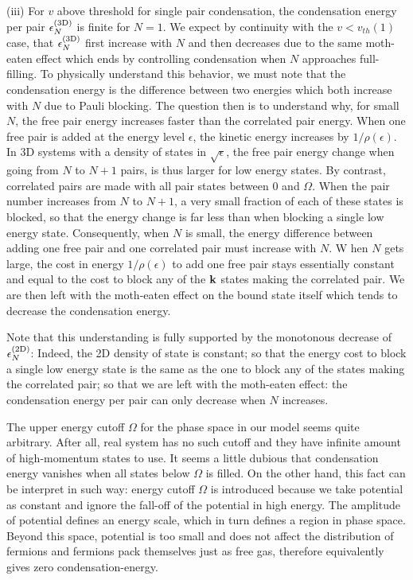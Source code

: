 \documentclass[5p,twocolumn]{elsarticle}
\begin{document}
(iii) For $v$ above threshold for single pair condensation, the condensation energy per pair $\epsilon^{{\text{(3D)}}}_N$ is finite for $N=1$. We expect by continuity with the $v<v_{th}(1)$ case, that $\epsilon^{{\text{(3D)}}}_N$ first increase with $N$ and then decreases due to the same moth-eaten effect which ends by controlling condensation when $N$ approaches full-filling.  
To physically understand this behavior, we must note that the condensation energy is the difference between two energies which both increase with $N$ due to Pauli blocking.  The question then is to understand why, for small $N$, the free pair energy increases faster than the correlated pair energy. When one free pair is added at the energy level $\epsilon$, the kinetic energy increases by $1/\rho(\epsilon)$.  In 3D systems with a density of states in $\sqrt{\epsilon}$, the free pair energy change when going from $N$ to $N+1$ pairs, is thus larger for low energy states. By contrast, correlated pairs are made with all pair states between $0$ and $\Omega$. When the pair number increases from $N$ to $N+1$, a very small fraction of each of these states is blocked, so that the energy change is far less than when blocking a single low energy state.  Consequently, when $N$ is small,  the energy difference between adding one free pair and one correlated pair must increase with $N$. W
 hen $N$ gets large, the cost in energy $1/\rho(\epsilon)$ to add one free pair stays essentially constant and equal to the cost to block any of the $\mathbf{k}$ states making the correlated pair.  We are then left with the moth-eaten effect on the bound state itself which tends to decrease the condensation energy. 

Note that this understanding is fully supported by the monotonous decrease of $\epsilon^{{\text{(2D)}}}_N$: Indeed, the 2D density of state is constant; so that the energy cost to block a single low energy state is the same as the one to block  any of the states making the correlated pair; so that we are left with the moth-eaten effect: the condensation energy per pair can only decrease when $N$ increases.  

The upper energy cutoff $\Omega$ for the phase space in our model seems quite arbitrary.  After all, real system has no such cutoff and they have infinite amount of high-momentum states to use.   It seems a little dubious that condensation energy vanishes when all states below $\Omega$ is filled.  On the other hand, this fact can be interpret in such way:  energy cutoff $\Omega$ is introduced because we take potential as constant and ignore the fall-off of the potential in high energy.  The amplitude of potential defines an energy scale, which in turn defines a region in phase space.  Beyond this space, potential is too small and does not affect the distribution of fermions and fermions pack themselves just as free gas, therefore equivalently gives zero condensation-energy. 
\end{document}
